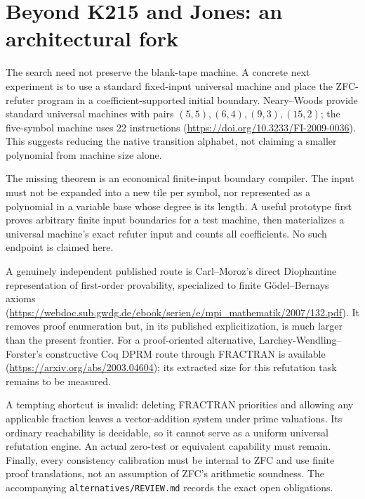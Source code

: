 \section{Beyond K215 and Jones: an architectural fork}
The search need not preserve the blank-tape machine. A concrete next experiment is to use a standard fixed-input universal machine and place the ZFC-refuter program in a coefficient-supported initial boundary. Neary--Woods provide standard universal machines with pairs $(5,5),(6,4),(9,3),(15,2)$; the five-symbol machine uses 22 instructions (\url{https://doi.org/10.3233/FI-2009-0036}). This suggests reducing the native transition alphabet, not claiming a smaller polynomial from machine size alone.

The missing theorem is an economical finite-input boundary compiler. The input must not be expanded into a new tile per symbol, nor represented as a polynomial in a variable base whose degree is its length. A useful prototype first proves arbitrary finite input boundaries for a test machine, then materializes a universal machine's exact refuter input and counts all coefficients. No such endpoint is claimed here.

A genuinely independent published route is Carl--Moroz's direct Diophantine representation of first-order provability, specialized to finite G\"odel--Bernays axioms (\url{https://webdoc.sub.gwdg.de/ebook/serien/e/mpi_mathematik/2007/132.pdf}). It removes proof enumeration but, in its published explicitization, is much larger than the present frontier. For a proof-oriented alternative, Larchey-Wendling--Forster's constructive Coq DPRM route through FRACTRAN is available (\url{https://arxiv.org/abs/2003.04604}); its extracted size for this refutation task remains to be measured.

A tempting shortcut is invalid: deleting FRACTRAN priorities and allowing any applicable fraction leaves a vector-addition system under prime valuations. Its ordinary reachability is decidable, so it cannot serve as a uniform universal refutation engine. An actual zero-test or equivalent capability must remain. Finally, every consistency calibration must be internal to ZFC and use finite proof translations, not an assumption of ZFC's arithmetic soundness. The accompanying \texttt{alternatives/REVIEW.md} records the exact open obligations.

